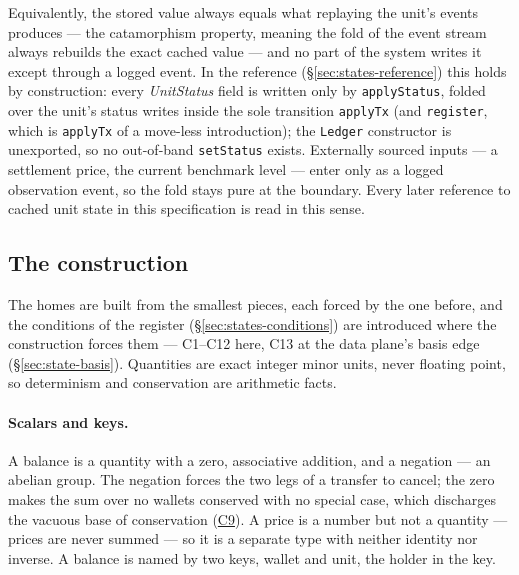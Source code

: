 \documentclass[11pt,a4paper]{article}
\begin{document}
Equivalently, the stored value always equals what replaying the unit's events produces ---
the catamorphism property, meaning the fold of the event stream always rebuilds the exact
cached value --- and no part of the system writes it except through a logged event. In the
reference (\S\ref{sec:states-reference}) this holds by construction: every
\emph{UnitStatus} field is written only by \texttt{applyStatus}, folded over the unit's
status writes inside the sole transition \texttt{applyTx} (and \texttt{register}, which is
\texttt{applyTx} of a move-less introduction); the
\texttt{Ledger} constructor is unexported, so no out-of-band \texttt{setStatus} exists.
Externally sourced inputs --- a settlement price, the current benchmark level --- enter
only as a logged observation event, so the fold stays pure at the boundary. Every later
reference to cached unit state in this specification is read in this sense.

\subsection{The construction}
\label{sec:states-construction}

The homes are built from the smallest pieces, each forced by the one before, and the
conditions of the register (\S\ref{sec:states-conditions}) are introduced where the
construction forces them --- C1--C12 here, C13 at the data plane's basis edge
(\S\ref{sec:state-basis}). Quantities are exact integer minor units, never floating point, so
determinism and conservation are arithmetic facts.

\paragraph{Scalars and keys.}
A balance is a quantity with a zero, associative addition, and a negation --- an abelian
group. The negation forces the two legs of a transfer to cancel; the zero makes the
sum over no wallets conserved with no special case, which discharges the vacuous base of
conservation (\hyperref[cond:C9]{C9}). A price is a number but not a quantity --- prices
are never summed --- so it is a separate type with neither identity nor inverse. A balance
is named by two keys, wallet and unit, the holder in the key.
\end{document}
